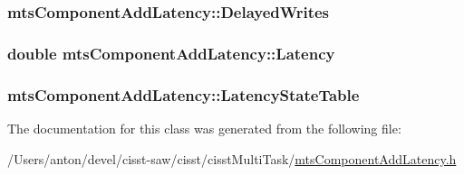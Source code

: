 \subsubsection[{Delayed\+Writes}]{ mts\+Component\+Add\+Latency\+::\+Delayed\+Writes\hspace{0.3cm}{\ttfamily [protected]}}\label{classmts_component_add_latency_af9d25ccc41677dbf2b56070c803467bd}
\hypertarget{classmts_component_add_latency_a39ff64ef2a5151a991f7173613136747}{}
\subsubsection[{Latency}]{\setlength{\rightskip}{0pt plus 5cm}double mts\+Component\+Add\+Latency\+::\+Latency\hspace{0.3cm}{\ttfamily [protected]}}\label{classmts_component_add_latency_a39ff64ef2a5151a991f7173613136747}
\hypertarget{classmts_component_add_latency_a41d4fcc2b22bd8bb53b2a99159f7b667}{}
\subsubsection[{Latency\+State\+Table}]{ mts\+Component\+Add\+Latency\+::\+Latency\+State\+Table\hspace{0.3cm}{\ttfamily [protected]}}\label{classmts_component_add_latency_a41d4fcc2b22bd8bb53b2a99159f7b667}


The documentation for this class was generated from the following file\+:\begin{DoxyCompactItemize}
\item 
/\+Users/anton/devel/cisst-\/saw/cisst/cisst\+Multi\+Task/\hyperlink{mts_component_add_latency_8h}{mts\+Component\+Add\+Latency.\+h}\end{DoxyCompactItemize}
